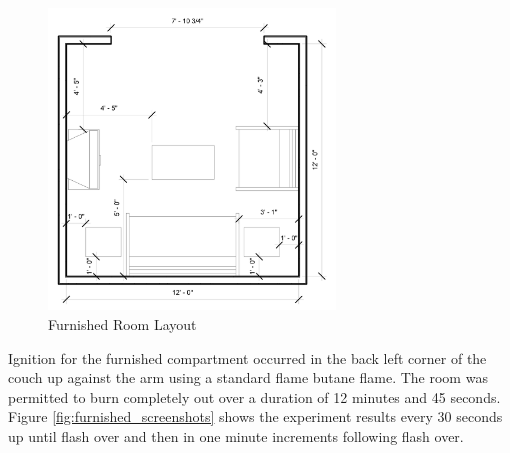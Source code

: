 \documentclass{article}
\begin{document}
\begin{figure}[H]
	\centering
	\includegraphics[width=3in]{0_Images/Vent_Limited_Room/Furnished_Room.jpg}
	\caption{Furnished Room Layout}
	\label{fig:furnished_layout}
\end{figure}

Ignition for the furnished compartment occurred in the back left corner of the couch up against the arm using a standard flame butane flame. The room was permitted to burn completely out over a duration of 12 minutes and 45 seconds. Figure \ref{fig:furnished_screenshots}  shows the experiment results every 30 seconds up until flash over and then in one minute increments following flash over. 
\end{document}
